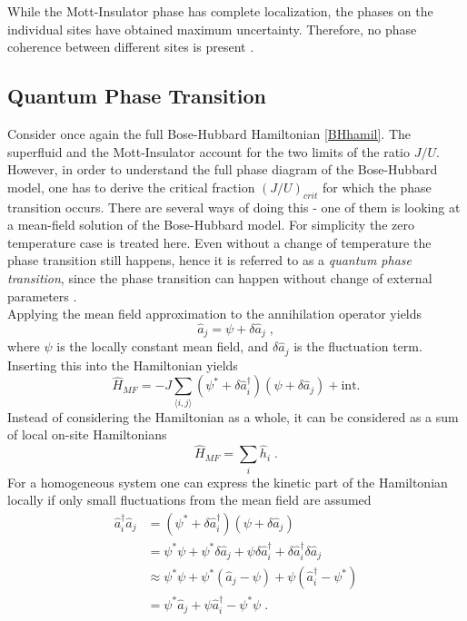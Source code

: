 While the Mott-Insulator phase has complete localization, the phases on the individual sites have obtained maximum uncertainty. Therefore, no phase coherence between different sites is present \cite{greiner}.


\subsection{Quantum Phase Transition}
Consider once again the full Bose-Hubbard Hamiltonian \eqref{BHhamil}. The superfluid and the Mott-Insulator account for the two limits of the ratio $J/U$. However, in order to understand the full phase diagram of the Bose-Hubbard model, one has to derive the critical fraction $(J/U)_{crit}$ for which the phase transition occurs. There are several ways of doing this - one of them is looking at a mean-field solution of the Bose-Hubbard model. For simplicity the zero temperature case is treated here. Even without a change of temperature the phase transition still happens, hence it is referred to as a \textit{quantum phase transition}, since the phase transition can happen without change of external parameters \cite{Sachdev2007QPT}.\\
Applying the mean field approximation to the annihilation operator yields
\begin{equation}
	\hat{a}_j = \psi + \delta \hat{a}_j \; ,
\end{equation}
where $\psi$ is the locally constant mean field, and $\delta \hat{a}_j$ is the fluctuation term. Inserting this into the Hamiltonian yields
\begin{equation}
	\hat{H}_{MF} = -J \sum_{\langle i,j \rangle} \left( \psi^* + \delta \hat{a}_{i}^{\dag} \right) \left( \psi + \delta \hat{a}_{j} \right) + \text{int.}
\end{equation}
Instead of considering the Hamiltonian as a whole, it can be considered as a sum of local on-site Hamiltonians
\begin{equation}
	\hat{H}_{MF} = \sum_{i} \hat{h}_i \; .
\end{equation}
For a homogeneous system one can express the kinetic part of the Hamiltonian locally if only small fluctuations from the mean field are assumed
\begin{align}
  \hat{a}_{i}^{\dag} \hat{a}_{j} &= \left( \psi^* + \delta \hat{a}_{i}^{\dag} \right) \left( \psi + \delta \hat{a}_{j} \right) \nonumber \\
  &= \psi^* \psi + \psi^* \delta \hat{a}_j + \psi \delta \hat{a}_{i}^{\dag} + \delta \hat{a}_{i}^{\dag} \delta \hat{a}_{j} \nonumber \\
  & \approx \psi^* \psi + \psi^* \left( \hat{a}_j - \psi \right) + \psi \left( \hat{a}_{i}^{\dag} - \psi^* \right) \nonumber \\
&= \psi^* \hat{a}_j + \psi \hat{a}_{i}^{\dag} - \psi^* \psi \; .
\end{align}
